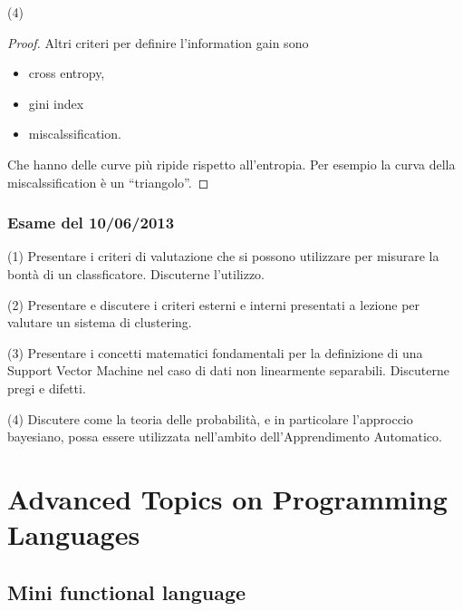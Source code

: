 \documentclass[12pt,a4paper,oneside]{book}
\begin{document}
\begin{exercise}{(4)}
\begin{proof}
        Altri criteri per definire l'information gain sono
        \begin{itemize}
            \item cross entropy,
            \item gini index
            \item miscalssification.
        \end{itemize}
        Che hanno delle curve più ripide rispetto all'entropia. Per
        esempio la curva della miscalssification è un ``triangolo''.
    \end{proof}
\end{exercise}

\subsection{Esame del 10/06/2013}

\begin{exercise}{(1)}
    Presentare i criteri di valutazione che si possono utilizzare per
    misurare la bontà di un classficatore. Discuterne l'utilizzo.
\end{exercise}

\begin{exercise}{(2)}
    Presentare e discutere i criteri esterni e interni presentati a
    lezione per valutare un sistema di clustering.
\end{exercise}

\begin{exercise}{(3)}
    Presentare i concetti matematici fondamentali per la definizione
    di una Support Vector Machine nel caso di dati non linearmente
    separabili. Discuterne pregi e difetti.
\end{exercise}

\begin{exercise}{(4)}
    Discutere come la teoria delle probabilità, e in particolare
    l'approccio bayesiano, possa essere utilizzata nell'ambito
    dell'Apprendimento Automatico.
\end{exercise}

\chapter{Advanced Topics on Programming Languages}

\section{Mini functional language}
\end{document}
